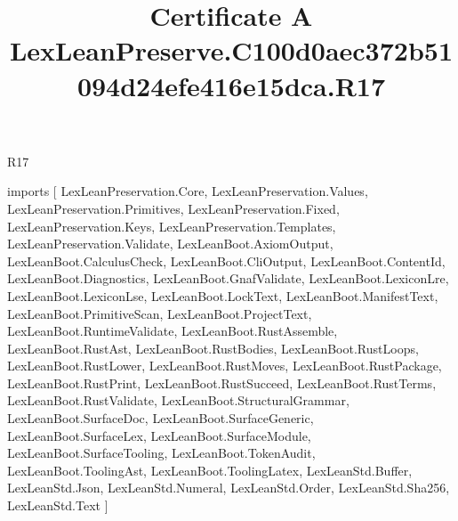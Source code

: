 \begin{lexlean}{R17}
\title{Certificate A LexLeanPreserve.C100d0aec372b51094d24efe416e15dca.R17}
\begin{coremodule}
imports [
  LexLeanPreservation.Core,
  LexLeanPreservation.Values,
  LexLeanPreservation.Primitives,
  LexLeanPreservation.Fixed,
  LexLeanPreservation.Keys,
  LexLeanPreservation.Templates,
  LexLeanPreservation.Validate,
  LexLeanBoot.AxiomOutput,
  LexLeanBoot.CalculusCheck,
  LexLeanBoot.CliOutput,
  LexLeanBoot.ContentId,
  LexLeanBoot.Diagnostics,
  LexLeanBoot.GnafValidate,
  LexLeanBoot.LexiconLre,
  LexLeanBoot.LexiconLse,
  LexLeanBoot.LockText,
  LexLeanBoot.ManifestText,
  LexLeanBoot.PrimitiveScan,
  LexLeanBoot.ProjectText,
  LexLeanBoot.RuntimeValidate,
  LexLeanBoot.RustAssemble,
  LexLeanBoot.RustAst,
  LexLeanBoot.RustBodies,
  LexLeanBoot.RustLoops,
  LexLeanBoot.RustLower,
  LexLeanBoot.RustMoves,
  LexLeanBoot.RustPackage,
  LexLeanBoot.RustPrint,
  LexLeanBoot.RustSucceed,
  LexLeanBoot.RustTerms,
  LexLeanBoot.RustValidate,
  LexLeanBoot.StructuralGrammar,
  LexLeanBoot.SurfaceDoc,
  LexLeanBoot.SurfaceGeneric,
  LexLeanBoot.SurfaceLex,
  LexLeanBoot.SurfaceModule,
  LexLeanBoot.SurfaceTooling,
  LexLeanBoot.TokenAudit,
  LexLeanBoot.ToolingAst,
  LexLeanBoot.ToolingLatex,
  LexLeanStd.Buffer,
  LexLeanStd.Json,
  LexLeanStd.Numeral,
  LexLeanStd.Order,
  LexLeanStd.Sha256,
  LexLeanStd.Text
]


\end{coremodule}
\end{lexlean}
